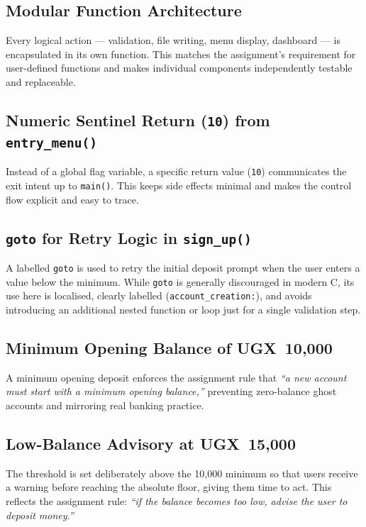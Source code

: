 \documentclass[12pt, a4paper]{article}
\begin{document}
\subsection{Modular Function Architecture}

Every logical action — validation, file writing, menu display, dashboard — is encapsulated
in its own function. This matches the assignment's requirement for user-defined functions
and makes individual components independently testable and replaceable.

\subsection{Numeric Sentinel Return (\texttt{10}) from \texttt{entry\_menu()}}

Instead of a global flag variable, a specific return value (\texttt{10}) communicates the
exit intent up to \texttt{main()}. This keeps side effects minimal and makes the control
flow explicit and easy to trace.

\subsection{\texttt{goto} for Retry Logic in \texttt{sign\_up()}}

A labelled \texttt{goto} is used to retry the initial deposit prompt when the user enters a
value below the minimum. While \texttt{goto} is generally discouraged in modern C, its use
here is localised, clearly labelled (\texttt{account\_creation:}), and avoids introducing an
additional nested function or loop just for a single validation step.

\subsection{Minimum Opening Balance of UGX~10{,}000}

A minimum opening deposit enforces the assignment rule that \textit{``a new account must
start with a minimum opening balance,''} preventing zero-balance ghost accounts and
mirroring real banking practice.

\subsection{Low-Balance Advisory at UGX~15{,}000}

The threshold is set deliberately above the 10{,}000 minimum so that users receive a
warning before reaching the absolute floor, giving them time to act. This reflects the
assignment rule: \textit{``if the balance becomes too low, advise the user to deposit
money.''}
\end{document}

